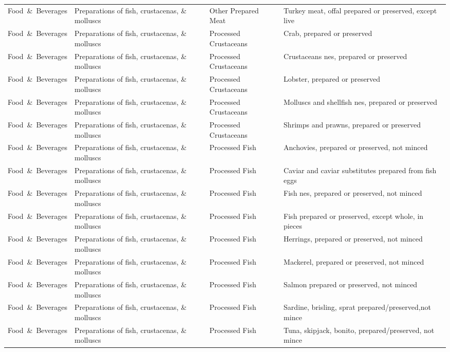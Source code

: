 \begin{appendices}
\begin{xltabular}{\textwidth}{|p{0.10\textwidth}|p{0.30\textwidth}|p{0.20\textwidth}|p{0.30\textwidth}|}
		Food\ \&\ Beverages & Preparations of fish, crustacenas, \& molluscs & Other Prepared Meat & Turkey meat, offal prepared or preserved, except live \\
		Food\ \&\ Beverages & Preparations of fish, crustacenas, \& molluscs & Processed Crustaceans & Crab, prepared or preserved \\
		Food\ \&\ Beverages & Preparations of fish, crustacenas, \& molluscs & Processed Crustaceans & Crustaceans nes, prepared or preserved \\
		Food\ \&\ Beverages & Preparations of fish, crustacenas, \& molluscs & Processed Crustaceans & Lobster, prepared or preserved \\
		Food\ \&\ Beverages & Preparations of fish, crustacenas, \& molluscs & Processed Crustaceans & Molluscs and shellfish nes, prepared or preserved \\
		Food\ \&\ Beverages & Preparations of fish, crustacenas, \& molluscs & Processed Crustaceans & Shrimps and prawns, prepared or preserved \\
		Food\ \&\ Beverages & Preparations of fish, crustacenas, \& molluscs & Processed Fish & Anchovies, prepared or preserved, not minced \\
		Food\ \&\ Beverages & Preparations of fish, crustacenas, \& molluscs & Processed Fish & Caviar and caviar substitutes prepared from fish eggs \\
		Food\ \&\ Beverages & Preparations of fish, crustacenas, \& molluscs & Processed Fish & Fish nes, prepared or preserved, not minced \\
		Food\ \&\ Beverages & Preparations of fish, crustacenas, \& molluscs & Processed Fish & Fish prepared or preserved, except whole, in pieces \\
		Food\ \&\ Beverages & Preparations of fish, crustacenas, \& molluscs & Processed Fish & Herrings, prepared or preserved, not minced \\
		Food\ \&\ Beverages & Preparations of fish, crustacenas, \& molluscs & Processed Fish & Mackerel, prepared or preserved, not minced \\
		Food\ \&\ Beverages & Preparations of fish, crustacenas, \& molluscs & Processed Fish & Salmon prepared or preserved, not minced \\
		Food\ \&\ Beverages & Preparations of fish, crustacenas, \& molluscs & Processed Fish & Sardine, brisling, sprat prepared/preserved,not mince \\
		Food\ \&\ Beverages & Preparations of fish, crustacenas, \& molluscs & Processed Fish & Tuna, skipjack, bonito, prepared/preserved, not mince \\

\end{xltabular}
\end{appendices}
